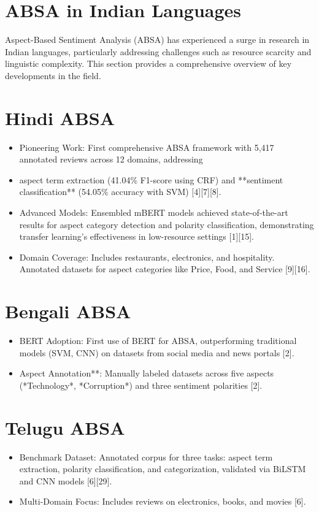 \documentclass{article}
\begin{document}
\section{ABSA in Indian Languages}
Aspect-Based Sentiment Analysis (ABSA) has experienced a surge in research in Indian languages, particularly addressing challenges such as resource scarcity and linguistic complexity. This section provides a comprehensive overview of key developments in the field.
\section{Hindi ABSA}
\begin{itemize}
\item Pioneering Work: First comprehensive ABSA framework with 5,417 annotated reviews across 12 domains, addressing \item aspect term extraction (41.04\% F1-score using CRF) and **sentiment classification** (54.05\% accuracy with SVM) [4][7][8].
\item Advanced Models: Ensembled mBERT models achieved state-of-the-art results for aspect category detection and polarity classification, demonstrating transfer learning’s effectiveness in low-resource settings [1][15].

\item Domain Coverage: Includes restaurants, electronics, and hospitality. Annotated datasets for aspect categories like Price, Food, and Service [9][16].

\end{itemize}

\section{Bengali ABSA}
\begin{itemize}
\item BERT Adoption: First use of BERT for ABSA, outperforming traditional models (SVM, CNN) on datasets from social media and news portals [2].
\item Aspect Annotation**: Manually labeled datasets across five aspects (*Technology*, *Corruption*) and three sentiment polarities [2].
\end{itemize}

\section{Telugu ABSA}
\begin{itemize}
\item Benchmark Dataset: Annotated corpus for three tasks: aspect term extraction, polarity classification, and categorization, validated via BiLSTM and CNN models [6][29].
\item Multi-Domain Focus: Includes reviews on electronics, books, and movies [6].

\end{itemize}
\end{document}
